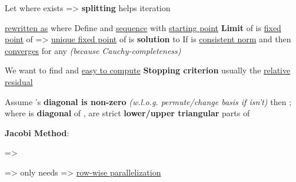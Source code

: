 Let  where 
exists => \textbf{splitting}  helps iteration
\begin{itemize}

      \vItem
             \underline{rewritten as}
             where
      \vItem
            Define  and \underline{sequence}
            with \underline{starting point} 
      \vItem
            \textbf{Limit} of  is \underline{fixed point} of  => \underline{unique fixed point} of 
            is \textbf{solution} to 
      \vItem
            If \iMbox{\lVert - \rVert} is \underline{consistent norm} and
             then  \underline{converges} for any
             \emph{(because Cauchy-completeness)}
            \begin{itemize}

                  \vItem
                        We want to find  and \underline{easy to compute} 
                  \vItem
                        \textbf{Stopping criterion} usually the \underline{relative residual}
            \end{itemize}
\end{itemize}

\hSep %

Assume 's \textbf{diagonal is non-zero} \emph{(w.l.o.g. permute/change basis if isn't)} then ;
where  is \textbf{diagonal} of ,  are strict \textbf{lower/upper triangular} parts of 

\hSep %

\textbf{Jacobi Method}:

 => 
\begin{itemize}
      \vItem
            =>  only needs
            => \underline{row-wise parallelization}
\end{itemize}

